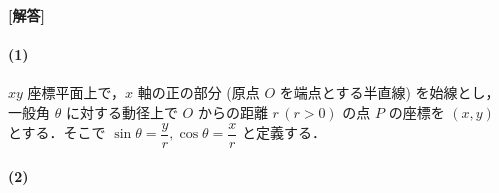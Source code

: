 \documentclass[../../main.tex]{subfiles}
\begin{document}
\begin{oframed}
  
\end{oframed}

{\bf [解答]}
\paragraph{(1)}

$xy$ 座標平面上で，$x$ 軸の正の部分 (原点 $O$ を端点とする半直線) を始線とし，一般角 $\theta$ に対する動径上で $O$ からの距離 $r\, (r>0)$ の点 $P$ の座標を $(x,y)$ とする．そこで $\sin\theta = \dfrac{y}{r}, \cos\theta = \dfrac{x}{r}$ と定義する．

\paragraph{(2)}
\end{document}
